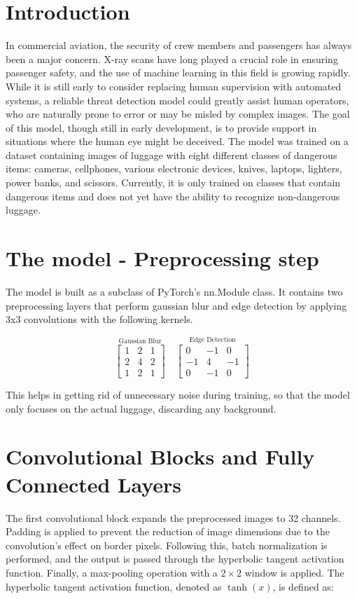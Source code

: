 \documentclass[twocolumn, fontsize=10pt]{article}
\begin{document}
\section{Introduction}
 In commercial aviation, the security of crew members and passengers has always been a major concern. X-ray scans have long played a crucial role in ensuring passenger safety, and the use of machine learning in this field is growing rapidly. While it is still early to consider replacing human supervision with automated systems, a reliable threat detection model could greatly assist human operators, who are naturally prone to error or may be misled by complex images. The goal of this model, though still in early development, is to provide support in situations where the human eye might be deceived. The model was trained on a dataset containing images of luggage with eight different classes of dangerous items: cameras, cellphones, various electronic devices, knives, laptops, lighters, power banks, and scissors. Currently, it is only trained on classes that contain dangerous items and does not yet have the ability to recognize non-dangerous luggage.

\section{The model - Preprocessing step}
The model is built as a subclass of PyTorch's nn.Module class. It contains two preprocessing layers that perform gaussian blur and edge detection by applying 3x3 convolutions with the following kernels.

\[
\overset{\text{Gaussian Blur}}{\begin{bmatrix}
1 & 2 & 1 \\
2 & 4 & 2 \\
1 & 2 & 1
\end{bmatrix}
}
\quad
\overset{\text{Edge Detection}}{\begin{bmatrix}
0 & -1 & 0 \\
-1 & 4 & -1 \\
0 & -1 & 0
\end{bmatrix}
}
\]

This helps in getting rid of unnecessary noise during training, so that the model only focuses on the actual luggage, discarding any background.

\section{Convolutional Blocks and Fully Connected Layers}
The first convolutional block expands the preprocessed images to 32 channels. Padding is applied to prevent the reduction of image dimensions due to the convolution's effect on border pixels. Following this, batch normalization is performed, and the output is passed through the hyperbolic tangent activation function. Finally, a max-pooling operation with a \(2 \times 2\) window is applied. The hyperbolic tangent activation function, denoted as \(\tanh(x)\), is defined as:
\end{document}
